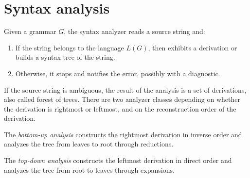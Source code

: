 \section{Syntax analysis}

Given a grammar $G$, the syntax analyzer reads a source string and: 
\begin{enumerate}
    \item If the string belongs to the language $L(G)$, then exhibits a derivation or builds a syntax tree of the string. 
    \item Otherwise, it stops and notifies the error, possibly with a diagnostic.
\end{enumerate}
If the source string is ambiguous, the result of the analysis is a set of derivations, also called forest of trees. 
There are two analyzer classes depending on whether the derivation is rightmost or leftmost, and on the reconstruction order of the derivation. 
\begin{definition}
    The \emph{bottom-up analysis} constructs the rightmost derivation in inverse order and analyzes the tree from leaves to root through reductions. 

    The \emph{top-down analysis} constructs the leftmost derivation in direct order and analyzes the tree from root to leaves through expansions. 
\end{definition}
